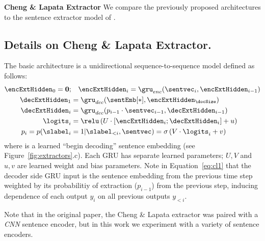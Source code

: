 \textbf{Cheng \& Lapata Extractor} 
We compare the previously proposed architectures to the sentence extractor
model of \cite{cheng2016neural}. 

\begin{toappendix}
\section{Details on Cheng \& Lapata Extractor.} \label{app:clextractor}
The basic architecture is a unidirectional
sequence-to-sequence
model defined as follows:
\begin{align}
    \encExtHidden_0 = \textbf{0};&\quad   \encExtHidden_i = \gru_{enc}(\sentvec_i, \encExtHidden_{i-1}) \\
    \decExtHidden_1 &= \gru_{dec}(\sentEmb[*], \encExtHidden_{\docSize}) \\
    \decExtHidden_i &= \gru_{dec}(p_{i-1} \cdot \sentvec_{i-1}, \decExtHidden_{i-1}) \label{eq:cl1} \\
   \logits_i &= \relu\left(U \cdot [\encExtHidden_i; \decExtHidden_i] + u \right)\\
    p_i = p(\slabel_i&=1|\slabel_{<i}, \sentvec) = \sigma\left(V\cdot \logits_i + v  \right) 
\end{align}
where \sentEmb[*] is a learned ``begin decoding'' sentence embedding
(see Figure~\ref{fig:extractors}.c).
Each GRU has separate learned 
parameters; $U, V$ and $u, v$ are learned weight and bias parameters.
Note in Equation~\ref{eq:cl1} that 
the decoder side GRU input is the sentence embedding from the previous time
step weighted by its probabilitiy of extraction ($p_{i-1}$) from the 
previous step, inducing dependence of each output $y_i$ on all previous 
outputs $y_{<i}$.
\end{toappendix}


Note that in the original paper, the Cheng \& Lapata extractor was paired 
with
a \textit{CNN} sentence encoder, but in this work we experiment with a variety
of sentence encoders.



